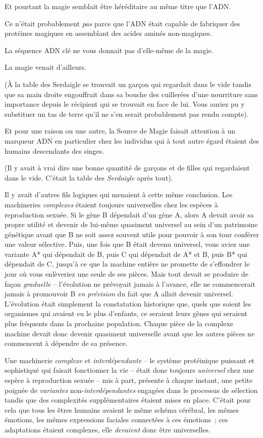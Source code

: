Et pourtant la magie semblait être héréditaire au même titre que l'ADN.

Ce n'était probablement \emph{pas} parce que l'ADN était capable de fabriquer des protéines magiques en assemblant des acides aminés non-magiques.

La séquence ADN clé ne vous donnait pas d'elle-même de la magie.

La magie venait d'ailleurs.

(À la table des Serdaigle se trouvait un garçon qui regardait dans le vide tandis que sa main droite engouffrait dans sa bouche des cuillerées d'une nourriture sans importance depuis le récipient qui se trouvait en face de lui. Vous auriez pu y substituer un tas de terre qu'il ne s'en serait probablement pas rendu compte).

Et pour une raison ou une autre, la Source de Magie faisait attention à un marqueur ADN en particulier chez les individus qui à tout autre égard étaient des humains descendants des singes.

(Il y avait à vrai dire une bonne quantité de garçons et de filles qui regardaient dans le vide. C'était la table des \emph{Serdaigle} après tout).

Il y avait d'autres fils logiques qui menaient à cette même conclusion. Les machineries \emph{complexes} étaient toujours universelles chez les espèces à reproduction sexuée. Si le gène B dépendait d'un gène A, alors A devait avoir sa propre utilité et devenir de lui-même quasiment universel au sein d'un patrimoine génétique avant que B ne soit assez souvent utile pour pouvoir à son tour conférer une valeur sélective. Puis, une fois que B était devenu universel, vous aviez une variante A* qui dépendait de B, puis C qui dépendait de A* et B, puis B* qui dépendait de C, jusqu'à ce que la machine entière ne promette de s'effondrer le jour où vous enlèveriez une seule de ses pièces. Mais tout devait se produire de façon \emph{graduelle} -- l'évolution ne prévoyait jamais à l'avance, elle ne commencerait jamais à promouvoir B \emph{en prévision} du fait que A allait devenir universel. L'évolution était simplement la constatation historique que, quels que soient les organismes qui avaient eu le plus d'enfants, ce seraient leurs gènes qui seraient plus fréquents dans la prochaine population. Chaque pièce de la complexe machine devait donc devenir quasiment universelle avant que les autres pièces ne commencent à dépendre de sa présence.

Une machinerie \emph{complexe} et \emph{interdépendante} -- le système protéinique puissant et sophistiqué qui faisait fonctionner la vie -- était donc toujours \emph{universel} chez une espèce à reproduction sexuée -- mis à part, présente à chaque instant, une petite poignée de \emph{variantes} non-\emph{interdépendantes} engagées dans le processus de sélection tandis que des complexités supplémentaires étaient mises en place. C'était pour cela que tous les êtres humains avaient le même schéma cérébral, les mêmes émotions, les mêmes expressions faciales connectées à ces émotions~; ces adaptations étaient complexes, elle \emph{devaient} donc être universelles.

